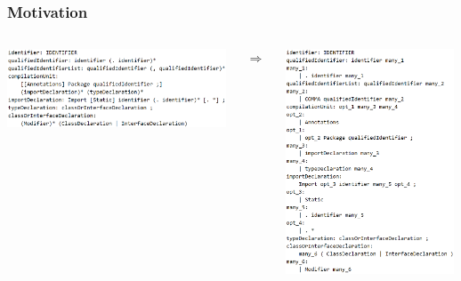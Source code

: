 \documentclass{beamer}
\begin{document}
	\begin{frame} 
		\frametitle{Motivation} 
		\begin{columns}
			\begin{column}{6.5cm}
				\includegraphics[width=6.5cm]{pictures/java_before.png}
			\end{column}
			\begin{column}{.7cm}
				$ \Longrightarrow $
			\end{column}
			\begin{column}{5cm}
				\includegraphics[width=5cm]{pictures/java_after.png}
			\end{column}
	    \end{columns}

	\end{frame}
\end{document}
